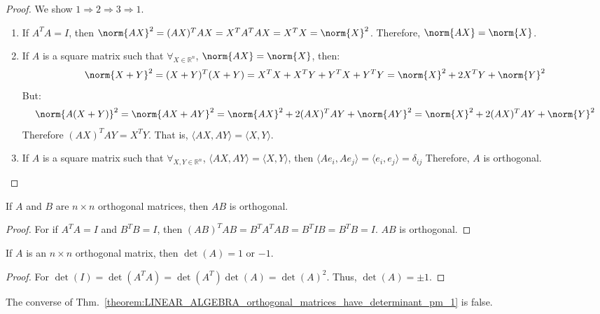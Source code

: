 \documentclass[crop=false,class=book,oneside]{standalone}                      %
\begin{document}
        \begin{proof}
        We show $1\Rightarrow 2 \Rightarrow 3 \Rightarrow 1$.
        \begin{enumerate}
            \item If $A^TA = I$, then $\norm{AX}^{2}=(AX)^{T}AX=X^{T}A^{T}AX=X^{T}X=\norm{X}^{2}$. Therefore, $\norm{AX}=\norm{X}$.
            \item If $A$ is a square matrix such that $\forall_{X\in\mathbb{R}^{n}}$, $\norm{AX} = \norm{X}$, then:
            \begin{equation*}
                \norm{X+Y}^{2}=(X+Y)^T(X+Y)=X^TX+X^TY+Y^TX+Y^TY=\norm{X}^2+2X^TY+\norm{Y}^2
            \end{equation*}
            But:
            \begin{equation*}
                \norm{A(X+Y)}^{2}=\norm{AX+AY}^{2}=\norm{AX}^{2}+2(AX)^{T}AY+\norm{AY}^2=\norm{X}^{2}+2(AX)^{T}AY+\norm{Y}^2
            \end{equation*}
            Therefore $(AX)^TAY = X^TY$. That is, $\langle AX, AY\rangle = \langle X, Y\rangle$.
            \item If $A$ is a square matrix such that $\forall_{X,Y\in \mathbb{R}^n}$, $\langle AX, AY\rangle = \langle X, Y\rangle$, then $\langle Ae_{i}, Ae_{j}\rangle=\langle e_i,e_j\rangle=\delta_{ij}$
            Therefore, $A$ is orthogonal.
        \end{enumerate}
        \end{proof}
        \begin{theorem}
        If $A$ and $B$ are $n\times n$ orthogonal matrices, then $AB$ is orthogonal.
        \end{theorem}
        \begin{proof}
        For if $A^{T}A = I$ and $B^{T}B = I$, then $(AB)^{T}AB = B^{T}A^{T}AB = B^{T}IB = B^{T}B = I$. $AB$ is orthogonal.
        \end{proof}
        \begin{theorem}
        \label{theorem:LINEAR_ALGEBRA_orthogonal_matrices_have_determinant_pm_1}
        If $A$ is an $n\times n$ orthogonal matrix, then $\det(A) = 1$ or $-1$.
        \end{theorem}
        \begin{proof}
        For $\det(I) = \det(A^TA) = \det(A^T)\det(A) = \det(A)^2$. Thus, $\det(A) = \pm 1$.
        \end{proof}
        \begin{remark}
        The converse of Thm.~\ref{theorem:LINEAR_ALGEBRA_orthogonal_matrices_have_determinant_pm_1} is false.
        \end{remark}
\end{document}
